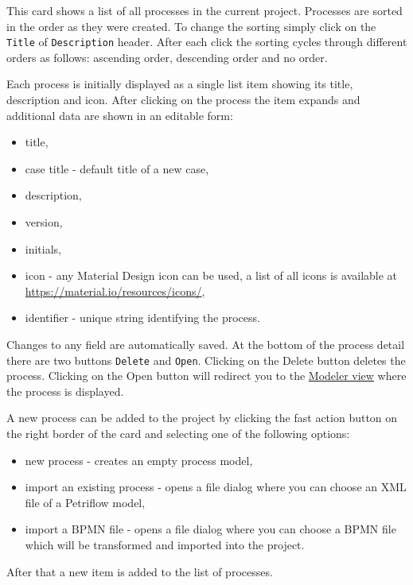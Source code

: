 This card shows a list of all processes in the current project.
Processes are sorted in the order as they were created.
To change the sorting simply click on the \texttt{Title} of \texttt{Description} header.
After each click the sorting cycles through different orders as follows: ascending order, descending order and no order.

Each process is initially displayed as a single list item showing its title, description and icon.
After clicking on the process the item expands and additional data are shown in an editable form:
\begin{itemize}
  \item title,
  \item case title - default title of a new case,
  \item description,
  \item version,
  \item initials,
  \item icon - any Material Design icon can be used, a list of all icons is available at \url{https://material.io/resources/icons/},
  \item identifier - unique string identifying the process.
\end{itemize}
Changes to any field are automatically saved.
At the bottom of the process detail there are two buttons \texttt{Delete} and \texttt{Open}.
Clicking on the Delete button deletes the process.
Clicking on the Open button will redirect you to the \hyperref[sec:modeler]{Modeler view} where the process is displayed.

A new process can be added to the project by clicking the fast action button on the right border of the card and selecting one of the following options:
\begin{itemize}
  \item new process - creates an empty process model,
  \item import an existing process - opens a file dialog where you can choose an XML file of a Petriflow model,
  \item import a BPMN file - opens a file dialog where you can choose a BPMN file which will be transformed and imported into the project.
\end{itemize}
After that a new item is added to the list of processes.
